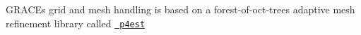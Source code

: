 GRACE\textquotesingle{}s grid and mesh handling is based on a forest-\/of-\/oct-\/trees adaptive mesh refinement library called \href{https://www.p4est.org/}{\texttt{ p4est}} 